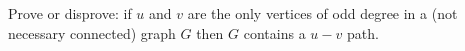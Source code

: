 \begin{hwproblem}{5}{
    Prove or disprove: if $u$ and $v$ are the only vertices of odd
    degree in a (not necessary connected) graph $G$ then $G$ contains a $u-v$ 
    path.
  }
\end{hwproblem}
